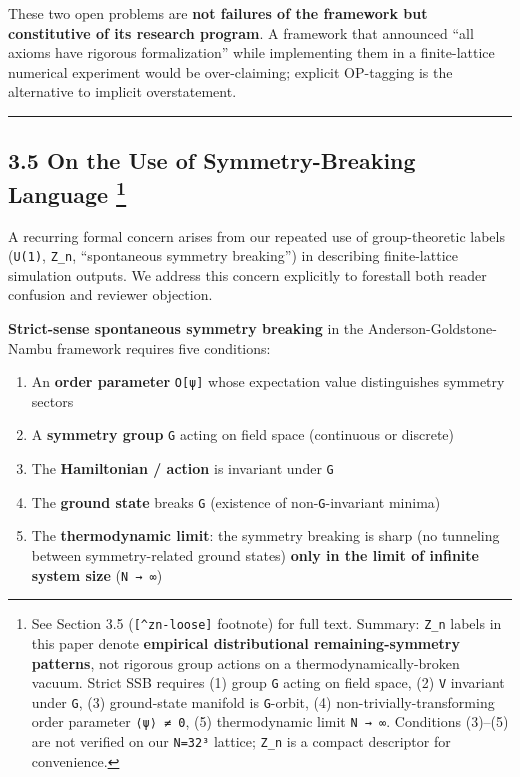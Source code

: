 \documentclass[
]{article}
\providecommand{\tightlist}{%
  \setlength{\itemsep}{0pt}\setlength{\parskip}{0pt}}
\begin{document}
These two open problems are \textbf{not failures of the framework but
constitutive of its research program}. A framework that announced ``all
axioms have rigorous formalization'' while implementing them in a
finite-lattice numerical experiment would be over-claiming; explicit
OP-tagging is the alternative to implicit overstatement.

\begin{center}\rule{0.5\linewidth}{0.5pt}\end{center}

\hypertarget{on-the-use-of-symmetry-breaking-language-zn-loose}{%
\subsection[3.5 On the Use of Symmetry-Breaking Language
]{\texorpdfstring{3.5 On the Use of Symmetry-Breaking Language
\footnote{See Section 3.5 (\texttt{{[}\^{}zn-loose{]}} footnote) for
  full text. Summary: \texttt{Z\_n} labels in this paper denote
  \textbf{empirical distributional remaining-symmetry patterns}, not
  rigorous group actions on a thermodynamically-broken vacuum. Strict
  SSB requires (1) group \texttt{G} acting on field space, (2)
  \texttt{V} invariant under \texttt{G}, (3) ground-state manifold is
  \texttt{G}-orbit, (4) non-trivially-transforming order parameter
  \texttt{⟨ψ⟩\ ≠\ 0}, (5) thermodynamic limit \texttt{N\ →\ ∞}.
  Conditions (3)--(5) are not verified on our \texttt{N=32³} lattice;
  \texttt{Z\_n} is a compact descriptor for convenience.}}{3.5 On the Use of Symmetry-Breaking Language }}\label{on-the-use-of-symmetry-breaking-language-zn-loose}}

A recurring formal concern arises from our repeated use of
group-theoretic labels (\texttt{U(1)}, \texttt{Z\_n}, ``spontaneous
symmetry breaking'') in describing finite-lattice simulation outputs. We
address this concern explicitly to forestall both reader confusion and
reviewer objection.

\textbf{Strict-sense spontaneous symmetry breaking} in the
Anderson-Goldstone-Nambu framework requires five conditions:

\begin{enumerate}
\def\labelenumi{\arabic{enumi}.}
\tightlist
\item
  An \textbf{order parameter} \texttt{O{[}ψ{]}} whose expectation value
  distinguishes symmetry sectors
\item
  A \textbf{symmetry group} \texttt{G} acting on field space (continuous
  or discrete)
\item
  The \textbf{Hamiltonian / action} is invariant under \texttt{G}
\item
  The \textbf{ground state} breaks \texttt{G} (existence of
  non-\texttt{G}-invariant minima)
\item
  The \textbf{thermodynamic limit}: the symmetry breaking is sharp (no
  tunneling between symmetry-related ground states) \textbf{only in the
  limit of infinite system size} (\texttt{N\ →\ ∞})
\end{enumerate}
\end{document}
